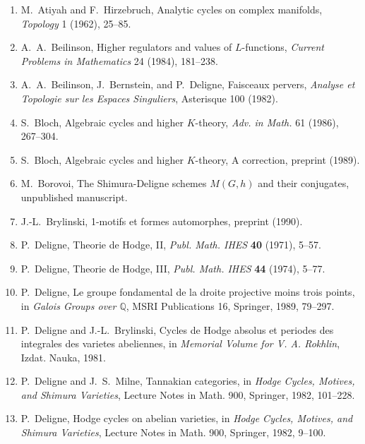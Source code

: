 \documentclass[11pt,a4paper]{article}
\theoremstyle{plain}
\theoremstyle{definition}
\newcommand{\Q}{\mathbb{Q}}
\begin{document}
\begin{enumerate}
\item[{[1]}] M.~Atiyah and F.~Hirzebruch, Analytic cycles on complex manifolds, \textit{Topology} 1 (1962), 25--85.

\item[{[2]}] A.~A.~Beilinson, Higher regulators and values of $L$-functions, \textit{Current Problems in Mathematics} 24 (1984), 181--238.

\item[{[3]}] A.~A.~Beilinson, J.~Bernstein, and P.~Deligne, Faisceaux pervers, \textit{Analyse et Topologie sur les Espaces Singuliers}, Asterisque 100 (1982).

\item[{[4]}] S.~Bloch, Algebraic cycles and higher $K$-theory, \textit{Adv. in Math.} 61 (1986), 267--304.

\item[{[5]}] S.~Bloch, Algebraic cycles and higher $K$-theory, A correction, preprint (1989).

\item[{[6]}] M.~Borovoi, The Shimura-Deligne schemes $M(G, h)$ and their conjugates, unpublished manuscript.

\item[{[7]}] J.-L.~Brylinski, 1-motifs et formes automorphes, preprint (1990).

\item[{[8]}] P.~Deligne, Theorie de Hodge, II, \textit{Publ. Math. IHES} \textbf{40} (1971), 5--57.

\item[{[9]}] P.~Deligne, Theorie de Hodge, III, \textit{Publ. Math. IHES} \textbf{44} (1974), 5--77.

\item[{[10]}] P.~Deligne, Le groupe fondamental de la droite projective moins trois points, in \textit{Galois Groups over $\Q$}, MSRI Publications 16, Springer, 1989, 79--297.

\item[{[11]}] P.~Deligne and J.-L.~Brylinski, Cycles de Hodge absolus et periodes des integrales des varietes abeliennes, in \textit{Memorial Volume for V. A. Rokhlin}, Izdat. Nauka, 1981.

\item[{[12]}] P.~Deligne and J.~S.~Milne, Tannakian categories, in \textit{Hodge Cycles, Motives, and Shimura Varieties}, Lecture Notes in Math. 900, Springer, 1982, 101--228.

\item[{[13]}] P.~Deligne, Hodge cycles on abelian varieties, in \textit{Hodge Cycles, Motives, and Shimura Varieties}, Lecture Notes in Math. 900, Springer, 1982, 9--100.


\end{enumerate}
\end{document}
